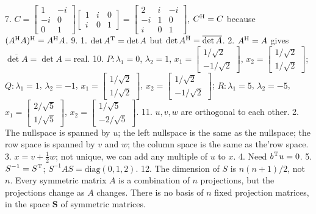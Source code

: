 
7. \(C=\begin{bmatrix}1&-i\\ -i&0\\ 0&1\end{bmatrix}\begin{bmatrix}1&i&0\\ i&0&1\end{bmatrix}=\begin{bmatrix}2&i&-i\\ -i&1&0\\ i&0&1\end{bmatrix}\), \(C^{\rm H}=C\) because \((A^{\rm H}A)^{\rm H}=A^{\rm H}A\).
9. 1. \(\det A^{\rm T}=\det A\) but \(\det A^{\rm H}=\overline{\det A}\). 2. \(A^{\rm H}=A\) gives \(\overline{\det A}=\det A=\text{real}\).
10. \(P:\lambda_{1}=0\), \(\lambda_{2}=1\), \(x_{1}=\begin{bmatrix}1/\sqrt{2}\\ -1/\sqrt{2}\end{bmatrix}\), \(x_{2}=\begin{bmatrix}1/\sqrt{2}\\ 1/\sqrt{2}\end{bmatrix}\); \(Q:\lambda_{1}=1\), \(\lambda_{2}=-1\), \(x_{1}=\begin{bmatrix}1/\sqrt{2}\\ 1/\sqrt{2}\end{bmatrix}\), \(x_{2}=\begin{bmatrix}1/\sqrt{2}\\ -1/\sqrt{2}\end{bmatrix}\); \(R:\lambda_{1}=5\), \(\lambda_{2}=-5\), \(x_{1}=\begin{bmatrix}2/\sqrt{5}\\ 1/\sqrt{5}\end{bmatrix}\), \(x_{2}=\begin{bmatrix}1/\sqrt{5}\\ -2/\sqrt{5}\end{bmatrix}\).
11. \(u,v,w\) are orthogonal to each other. 2. The nullspace is spanned by \(u\); the left nullspace is the same as the nullspace; the row space is spanned by \(v\) and \(w\); the column space is the same as the'row space. 3. \(x=v+\frac{1}{2}w\); not unique, we can add any multiple of \(u\) to \(x\). 4. Need \(b^{\rm T}u=0\). 5. \(S^{-1}=S^{\rm T}\); \(S^{-1}AS=\text{diag}(0,1,2)\).
12. The dimension of \(S\) is \(n(n+1)/2\), not \(n\). Every symmetric matrix \(A\) is a combination of \(n\) projections, but the projections change as \(A\) changes. There is no basis of \(n\) fixed projection matrices, in the space \(\mathbf{S}\) of symmetric matrices.

